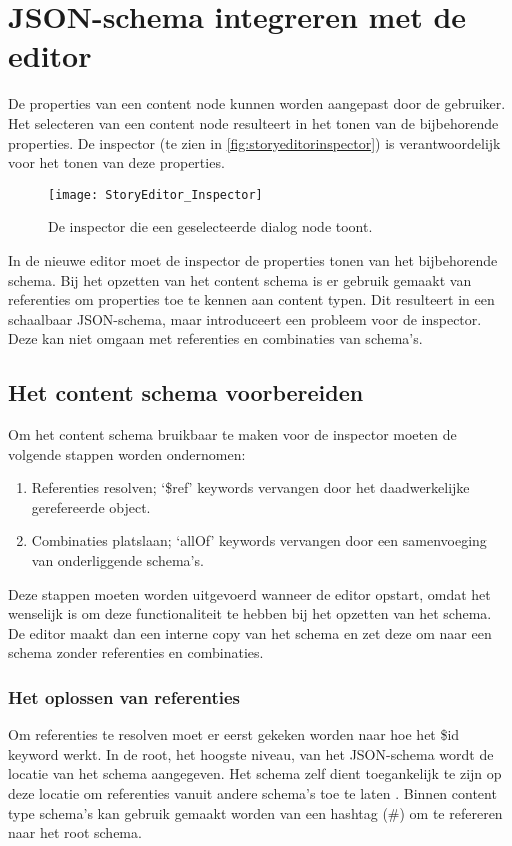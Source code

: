\section{JSON-schema integreren met de editor}
De properties van een content node kunnen worden aangepast door de gebruiker. Het selecteren van een content node resulteert in het tonen van de bijbehorende properties. De inspector (te zien in \autoref{fig:storyeditorinspector}) is verantwoordelijk voor het tonen van deze properties.

\begin{figure}[htb]
    \texttt{[image: StoryEditor\_Inspector]}
    \caption{De inspector die een geselecteerde dialog node toont.}
    \label{fig:storyeditorinspector}
    \centering
\end{figure}

In de nieuwe editor moet de inspector de properties tonen van het bijbehorende schema. Bij het opzetten van het content schema is er gebruik gemaakt van referenties om properties toe te kennen aan content typen. Dit resulteert in een schaalbaar JSON-schema, maar introduceert een probleem voor de inspector. Deze kan niet omgaan met referenties en combinaties van schema’s.

\subsection{Het content schema voorbereiden}
Om het content schema bruikbaar te maken voor de inspector moeten de volgende stappen worden ondernomen:

\begin{enumerate}
    \item Referenties resolven; ‘\$ref’ keywords vervangen door het daadwerkelijke gerefereerde object.
    \item Combinaties platslaan; ‘allOf’ keywords vervangen door een samenvoeging van onderliggende schema’s.
\end{enumerate}

Deze stappen moeten worden uitgevoerd wanneer de editor opstart, omdat het wenselijk is om deze functionaliteit te hebben bij het opzetten van het schema. De editor maakt dan een interne copy van het schema en zet deze om naar een schema zonder referenties en combinaties.

\subsubsection{Het oplossen van referenties}
Om referenties te resolven moet er eerst gekeken worden naar hoe het \$id keyword werkt. In de root, het hoogste niveau, van het JSON-schema wordt de locatie van het schema aangegeven. Het schema zelf dient toegankelijk te zijn op deze locatie om referenties vanuit andere schema’s toe te laten \cite{DraftJSONSchema07}. Binnen content type schema’s kan gebruik gemaakt worden van een hashtag (\#) om te refereren naar het root schema.

